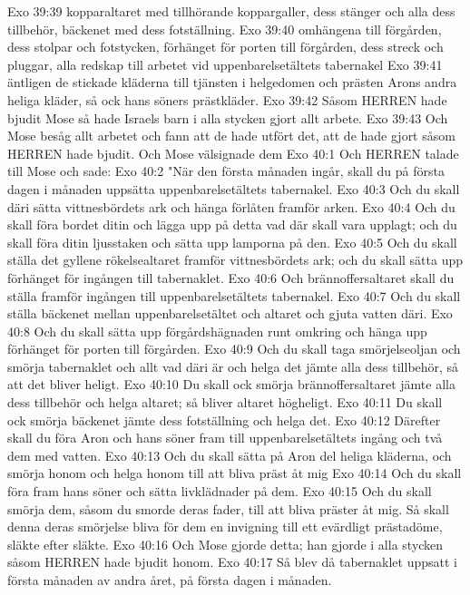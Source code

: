 Exo 39:39  kopparaltaret med tillhörande koppargaller, dess stänger och alla dess tillbehör, bäckenet med dess fotställning.
Exo 39:40  omhängena till förgården, dess stolpar och fotstycken, förhänget för porten till förgården, dess streck och pluggar, alla redskap till arbetet vid uppenbarelsetältets tabernakel
Exo 39:41  äntligen de stickade kläderna till tjänsten i helgedomen och prästen Arons andra heliga kläder, så ock hans söners prästkläder.
Exo 39:42  Såsom HERREN hade bjudit Mose så hade Israels barn i alla stycken gjort allt arbete.
Exo 39:43  Och Mose besåg allt arbetet och fann att de hade utfört det, att de hade gjort såsom HERREN hade bjudit. Och Mose välsignade dem
Exo 40:1  Och HERREN talade till Mose och sade:
Exo 40:2  "När den första månaden ingår, skall du på första dagen i månaden uppsätta uppenbarelsetältets tabernakel.
Exo 40:3  Och du skall däri sätta vittnesbördets ark och hänga förlåten framför arken.
Exo 40:4  Och du skall föra bordet ditin och lägga upp på detta vad där skall vara upplagt; och du skall föra ditin ljusstaken och sätta upp lamporna på den.
Exo 40:5  Och du skall ställa det gyllene rökelsealtaret framför vittnesbördets ark; och du skall sätta upp förhänget för ingången till tabernaklet.
Exo 40:6  Och brännoffersaltaret skall du ställa framför ingången till uppenbarelsetältets tabernakel.
Exo 40:7  Och du skall ställa bäckenet mellan uppenbarelsetältet och altaret och gjuta vatten däri.
Exo 40:8  Och du skall sätta upp förgårdshägnaden runt omkring och hänga upp förhänget för porten till förgården.
Exo 40:9  Och du skall taga smörjelseoljan och smörja tabernaklet och allt vad däri är och helga det jämte alla dess tillbehör, så att det bliver heligt.
Exo 40:10  Du skall ock smörja brännoffersaltaret jämte alla dess tillbehör och helga altaret; så bliver altaret högheligt.
Exo 40:11  Du skall ock smörja bäckenet jämte dess fotställning och helga det.
Exo 40:12  Därefter skall du föra Aron och hans söner fram till uppenbarelsetältets ingång och två dem med vatten.
Exo 40:13  Och du skall sätta på Aron del heliga kläderna, och smörja honom och helga honom till att bliva präst åt mig
Exo 40:14  Och du skall föra fram hans söner och sätta livklädnader på dem.
Exo 40:15  Och du skall smörja dem, såsom du smorde deras fader, till att bliva präster åt mig. Så skall denna deras smörjelse bliva för dem en invigning till ett evärdligt prästadöme, släkte efter släkte.
Exo 40:16  Och Mose gjorde detta; han gjorde i alla stycken såsom HERREN hade bjudit honom.
Exo 40:17  Så blev då tabernaklet uppsatt i första månaden av andra året, på första dagen i månaden.
